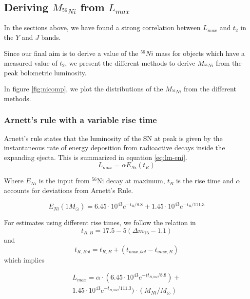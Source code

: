 \subsection{Deriving $M_{^{56}Ni}$ from $L_{max}$}
\label{ssec-derni}
In the sections above, we have found a strong correlation between $L_{max}$ and $t_2$ in the $Y$ and $J$ bands. 

Since our final aim is to derive a value of the $^{56}Ni$ mass for objects which have a measured value of $t_2$, we present the different methods to derive $M_{^{56}Ni}$ from the peak bolometric luminosity.

In figure \ref{fig:nicomp}, we plot the distributions of the $M_{^{56}Ni}$ from the different methods.
\subsubsection{Arnett's rule with a variable rise time}
Arnett's rule states that the luminosity of the SN at peak is given by the instantaneous rate of energy deposition from radioactive decays inside the expanding ejecta. 
This is summarized in equation \eqref{eq:lm-eni}. 
\begin{equation}
L_{max}=\alpha E_{Ni} (t_R)
\end{equation}

Where $E_{Ni}$ is the input from $^{56}$Ni decay at maximum, $t_R$ is the rise time and $\alpha$ accounts for deviations from Arnett's Rule.

\begin{equation}
\label{eq:eni}
E_{Ni} (1 M_{\odot})= 6.45  \cdot 10^{43} e^{-t_R/8.8} + 1.45  \cdot  10^{43} e^{-t_R/111.3}
\end{equation}

For estimates using different rise times, we follow the relation in \citet{G2011}
\begin{equation}
t_{R, B}=17.5 - 5(\Delta m_{15} - 1.1)
\end{equation}
and  
\begin{equation}
t_{R, Bol}=t_{R, B}+ (t_{max, bol} -t_{max, B})
\end{equation}
which implies 

\begin{multline}
L_{max}=\alpha \cdot (6.45  \cdot  10^{43} e^{-(t_{R, bol}/8.8}) + \\ 1.45  \cdot  10^{43} e^{-t_{R,bol}/111.3})  \cdot(M_{Ni}/M_{\odot})
\end{multline}

